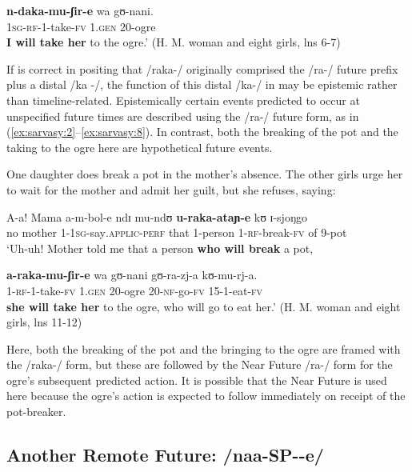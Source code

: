 \documentclass[output=paper]{langsci/langscibook}
\begin{document}
\gll \textbf{n-daka-mu-ʃir-e}   wa   gʊ-nani. \\
\textsc{1sg-rf-}1-take-\textsc{fv}  1.\textsc{gen}  20-ogre \\
\glt \textbf{I will take her} to the ogre.’ (H. M. woman and eight girls, lns 6-7)
\z

If \citet{Botne1999} is correct in positing that /raka-/ originally comprised the /ra-/ future prefix plus a distal /ka%
%
-/, the function of this distal /ka-/ in  may be epistemic rather than timeline-related. Epistemically certain events predicted to occur at unspecified future times are described using the /ra-/ future form, as in (\ref{ex:sarvasy:2}--\ref{ex:sarvasy:8}). In contrast, both the breaking of the pot and the taking to the ogre here are hypothetical future events. 

One daughter does break a pot in the mother’s absence. The other girls urge her to wait for the mother and admit her guilt, but she refuses, saying:

\ea\label{ex:sarvasy:15}
\gll A-a!  Mama    a-m-bol-e      ndɪ   mu-ndʊ   \textbf{u-raka-ataɲ-e}   kʊ   ɪ-sjoŋgo  \\
no  mother  1-1\textsc{sg}-say\textsc{.applic-perf}  that  1-person  1\textsc{-rf}-break-\textsc{fv}  of  9-pot\\
\glt `Uh-uh! Mother told me that a person \textbf{who will break} a pot,

\gll \textbf{a-raka-mu-ʃir-e}   wa   gʊ-nani  gʊ-ra-zj-a  kʊ-mu-rj-a.\\
1\textsc{-rf-}1-take-\textsc{fv}    1.\textsc{gen}  20-ogre  20-\textsc{nf}-go-\textsc{fv}  15-1-eat-\textsc{fv} \\
\glt \textbf{she will take her} to the ogre, who will go to eat her.' (H. M. woman and eight girls, lns 11-12)
\z

Here, both the breaking of the pot and the bringing to the ogre are framed with the /raka-/ form, but these are followed by the Near Future /ra-/ form for the ogre’s subsequent predicted action. It is possible that the Near Future is used here because the ogre’s action is expected to follow immediately on receipt of the pot-breaker.

\subsection{Another Remote Future: /naa-SP-{\longrule}-e/}\label{sec:sarvasy:6.2}
\end{document}
